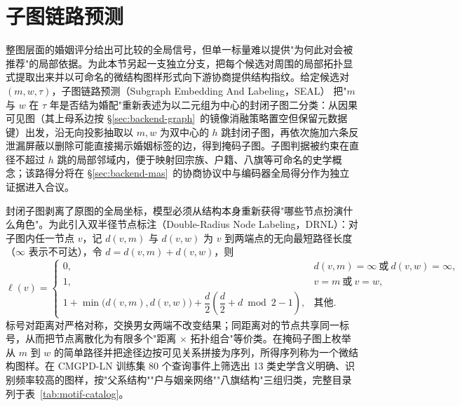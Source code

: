 \section{子图链路预测}\label{sec:backend-seal}

整图层面的婚姻评分给出可比较的全局信号，但单一标量难以提供"为何此对会被推荐"的局部依据。为此本节另起一支独立分支，把每个候选对周围的局部拓扑显式提取出来并以可命名的微结构图样形式向下游协商提供结构指纹。给定候选对 \((m,w,\tau)\)，子图链路预测（Subgraph Embedding And Labeling，SEAL）\citep{zhang2018seal} 把"\(m\) 与 \(w\) 在 \(\tau\) 年是否结为婚配"重新表述为以二元组为中心的封闭子图二分类：从因果可见图（其上母系边按 \S\ref{sec:backend-graph}~的镜像消融策略置空但保留元数据键）出发，沿无向投影抽取以 \(m,w\) 为双中心的 \(h\) 跳封闭子图，再依次施加六条反泄漏屏蔽以删除可能直接揭示婚姻标签的边，得到掩码子图。子图判据被约束在直径不超过 \(h\) 跳的局部邻域内，便于映射回宗族、户籍、八旗等可命名的史学概念；该路得分将在 \S\ref{sec:backend-mas}~的协商协议中与编码器全局得分作为独立证据进入合议。

封闭子图剥离了原图的全局坐标，模型必须从结构本身重新获得"哪些节点扮演什么角色"。为此引入双半径节点标注（Double-Radius Node Labeling，DRNL）：对子图内任一节点 \(v\)，记 \(d(v,m)\) 与 \(d(v,w)\) 为 \(v\) 到两端点的无向最短路径长度（\(\infty\) 表示不可达），令 \(d=d(v,m)+d(v,w)\)，则
\begin{equation}\label{eq:drnl}
\ell(v)=
\begin{cases}
0, & d(v,m)=\infty\ \text{或}\ d(v,w)=\infty,\\[3pt]
1, & v=m\ \text{或}\ v=w,\\[3pt]
1+\min\!\big(d(v,m),d(v,w)\big)+\dfrac{d}{2}\!\left(\dfrac{d}{2}+d\bmod 2-1\right), & \text{其他}.
\end{cases}
\end{equation}
标号对距离对严格对称，交换男女两端不改变结果；同距离对的节点共享同一标号，从而把节点离散化为有限多个"距离 \(\times\) 拓扑组合"等价类。在掩码子图上枚举从 \(m\) 到 \(w\) 的简单路径并把途径边按可见关系拼接为序列，所得序列称为一个微结构图样。在 CMGPD-LN 训练集 80 个查询事件上筛选出 13 类史学含义明确、识别频率较高的图样，按"父系结构""户与姻亲网络""八旗结构"三组归类，完整目录列于表~\ref{tab:motif-catalog}。

